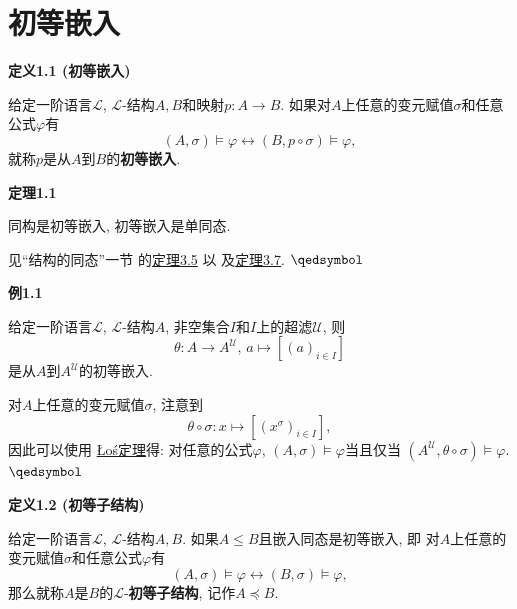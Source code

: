 \documentclass[UTF8]{ctexart}
\begin{document}
\setlength{\abovedisplayskip}{1pt}
\setlength{\belowdisplayskip}{1pt}

\section{初等嵌入}

\hypertarget{sec:定义1.1}{}
\noindent\textbf{定义1.1 (初等嵌入)}

给定一阶语言$\mathcal{L}$, $\mathcal{L}$-结构$A,B$和映射$p:A\to B$.
如果对$A$上任意的变元赋值$\sigma$和任意公式$\varphi$有
\[
    (A,\sigma)\models\varphi\leftrightarrow(B,p\circ\sigma)\models\varphi,
\]
就称$p$是从$A$到$B$的\textbf{初等嵌入}.

\vspace{10pt}

\hypertarget{sec:定理1.1}{}
\noindent\textbf{定理1.1}

同构是初等嵌入, 初等嵌入是单同态.


见``结构的同态''一节
的\href{../01 一阶语言的结构/02 结构的同态#nameddest=sec:定理3.5}{定理3.5} 以
及\href{../01 一阶语言的结构/02 结构的同态#nameddest=sec:定理3.7}{定理3.7}.
\hfill $\qedsymbol$

\vspace{10pt}

\hypertarget{sec:例1.1}{}
\noindent\textbf{例1.1}

给定一阶语言$\mathcal{L}$, $\mathcal{L}$-结构$A$,
非空集合$I$和$I$上的超滤$\mathcal{U}$, 则
\[
    \theta:A\to A^{\mathcal{U}},\,a\mapsto[(a)_{i\in I}]
\]
是从$A$到$A^{\mathcal{U}}$的初等嵌入.


对$A$上任意的变元赋值$\sigma$, 注意到
\[
    \theta\circ\sigma:x\mapsto[(x^\sigma)_{i\in I}],
\]
因此可以使用 \href{../03 一阶紧致性定理/02 Łoś 定理#nameddest=sec:定理1.1}
{Łoś定理}得: 对任意的公式$\varphi$, $(A,\sigma)\models\varphi$当且仅当
$(A^{\mathcal{U}},\theta\circ\sigma)\models\varphi$. \hfill $\qedsymbol$

\vspace{10pt}

\hypertarget{sec:定义1.2}{}
\noindent\textbf{定义1.2 (初等子结构)}

给定一阶语言$\mathcal{L}$, $\mathcal{L}$-结构$A,B$.
如果$A\leqslant B$且嵌入同态是初等嵌入, 即
对$A$上任意的变元赋值$\sigma$和任意公式$\varphi$有
\[
    (A,\sigma)\models\varphi\leftrightarrow(B,\sigma)\models\varphi,
\]
那么就称$A$是$B$的$\mathcal{L}$-\textbf{初等子结构}, 记作$A\preccurlyeq B$.
\end{document}
